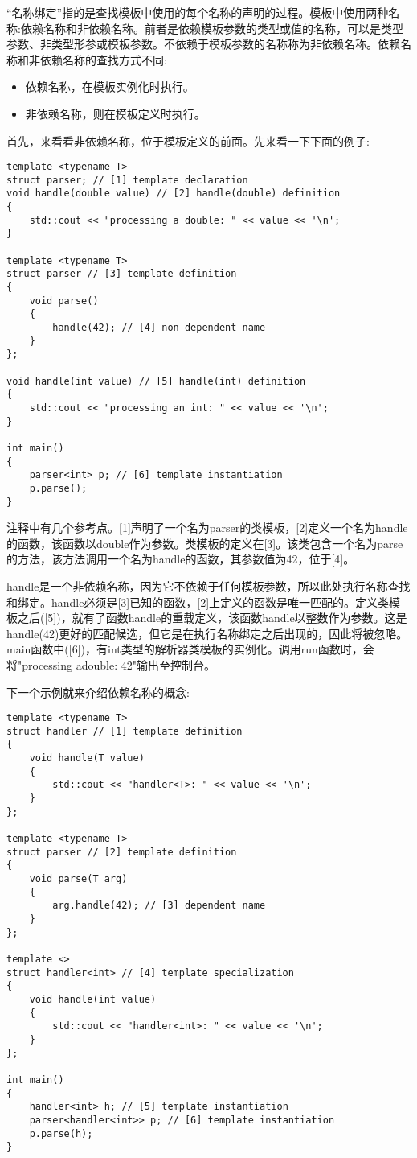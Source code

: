 
“名称绑定”指的是查找模板中使用的每个名称的声明的过程。模板中使用两种名称:依赖名称和非依赖名称。前者是依赖模板参数的类型或值的名称，可以是类型参数、非类型形参或模板参数。不依赖于模板参数的名称称为非依赖名称。依赖名称和非依赖名称的查找方式不同:

\begin{itemize}
\item
依赖名称，在模板实例化时执行。

\item
非依赖名称，则在模板定义时执行。
\end{itemize}

首先，来看看非依赖名称，位于模板定义的前面。先来看一下下面的例子:

\begin{lstlisting}[style=styleCXX]
template <typename T>
struct parser; // [1] template declaration
void handle(double value) // [2] handle(double) definition
{
	std::cout << "processing a double: " << value << '\n';
}

template <typename T>
struct parser // [3] template definition
{
	void parse()
	{
		handle(42); // [4] non-dependent name
	}
};

void handle(int value) // [5] handle(int) definition
{
	std::cout << "processing an int: " << value << '\n';
}

int main()
{
	parser<int> p; // [6] template instantiation
	p.parse();
}
\end{lstlisting}

注释中有几个参考点。[1]声明了一个名为parser的类模板，[2]定义一个名为handle的函数，该函数以double作为参数。类模板的定义在[3]。该类包含一个名为parse的方法，该方法调用一个名为handle的函数，其参数值为42，位于[4]。

handle是一个非依赖名称，因为它不依赖于任何模板参数，所以此处执行名称查找和绑定。handle必须是[3]已知的函数，[2]上定义的函数是唯一匹配的。定义类模板之后([5])，就有了函数handle的重载定义，该函数handle以整数作为参数。这是handle(42)更好的匹配候选，但它是在执行名称绑定之后出现的，因此将被忽略。main函数中([6])，有int类型的解析器类模板的实例化。调用run函数时，会将"processing adouble: 42"输出至控制台。

下一个示例就来介绍依赖名称的概念:

\begin{lstlisting}[style=styleCXX]
template <typename T>
struct handler // [1] template definition
{
	void handle(T value)
	{
		std::cout << "handler<T>: " << value << '\n';
	}
};

template <typename T>
struct parser // [2] template definition
{
	void parse(T arg)
	{
		arg.handle(42); // [3] dependent name
	}
};

template <>
struct handler<int> // [4] template specialization
{
	void handle(int value)
	{
		std::cout << "handler<int>: " << value << '\n';
	}
};

int main()
{
	handler<int> h; // [5] template instantiation
	parser<handler<int>> p; // [6] template instantiation
	p.parse(h);
}
\end{lstlisting}

